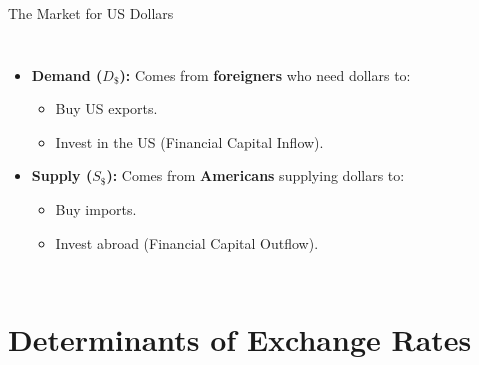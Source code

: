 \documentclass[aspectratio=169]{beamer}
\begin{document}
\begin{frame}{The Market for US Dollars}
    \begin{columns}
        \begin{itemize}
            \item \textbf{Demand ($D_{\$}$):} Comes from \textbf{foreigners} who need dollars to:
            \begin{itemize}
                \item Buy US exports.
                \item Invest in the US (Financial Capital Inflow).
            \end{itemize}
            \item \textbf{Supply ($S_{\$}$):} Comes from \textbf{Americans} supplying dollars to:
            \begin{itemize}
                \item Buy imports.
                \item Invest abroad (Financial Capital Outflow).
            \end{itemize}
        \end{itemize}
        
    \end{columns}
\end{frame}

\section{Determinants of Exchange Rates}
\end{document}
